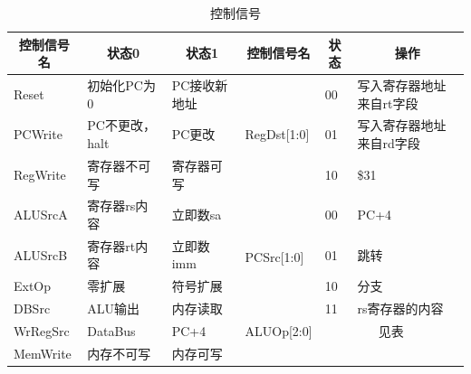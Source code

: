 \begin{table}[H]
  \centering\xiaowu
  \caption{控制信号}
    \begin{tabular}{|l|l|l|c|c|c|}
    \hline
    \multicolumn{1}{|c|}{控制信号名} & \multicolumn{1}{c|}{状态0} & \multicolumn{1}{c|}{状态1} & 控制信号名 & 状态    & 操作 \\
    \hline
    Reset & 初始化PC为0 & PC接收新地址 & \multicolumn{1}{l|}{\multirow{3}[6]{*}{RegDst[1:0]}} & \multicolumn{1}{l|}{00} & \multicolumn{1}{l|}{写入寄存器地址来自rt字段} \\
\cline{1-3}\cline{5-6}    PCWrite & PC不更改，halt & PC更改  &       & \multicolumn{1}{l|}{01} & \multicolumn{1}{l|}{写入寄存器地址来自rd字段} \\
\cline{1-3}\cline{5-6}    RegWrite & 寄存器不可写 & 寄存器可写 &       & \multicolumn{1}{l|}{10} & \multicolumn{1}{l|}{\$31 } \\
    \hline
    ALUSrcA & 寄存器rs内容 & 立即数sa & \multicolumn{1}{l|}{\multirow{4}[8]{*}{PCSrc[1:0]}} & \multicolumn{1}{l|}{00} & \multicolumn{1}{l|}{PC+4} \\
\cline{1-3}\cline{5-6}    ALUSrcB & 寄存器rt内容 & 立即数imm &       & \multicolumn{1}{l|}{01} & \multicolumn{1}{l|}{跳转} \\
\cline{1-3}\cline{5-6}    ExtOp & 零扩展   & 符号扩展  &       & \multicolumn{1}{l|}{10} & \multicolumn{1}{l|}{分支} \\
\cline{1-3}\cline{5-6}    DBSrc & ALU输出 & 内存读取  &       & \multicolumn{1}{l|}{11} & \multicolumn{1}{l|}{rs寄存器的内容} \\
    \hline
    WrRegSrc & DataBus & PC+4  & \multicolumn{1}{l|}{ALUOp[2:0]} & \multicolumn{2}{c|}{见表} \\
    \hline
    MemWrite & 内存不可写 & 内存可写  & \multicolumn{3}{c|}{} \\
    \hline
    \end{tabular}%
  \label{tab:control}%
\end{table}%


